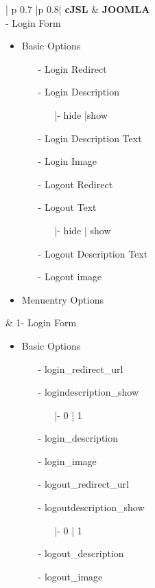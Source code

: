 \begin{minipage}{0.7\textwidth}
\begin{longtable}{| p {0.7\textwidth} |p {0.8\textwidth}|}
\hline
\textbf{cJSL}
&  
\textbf{JOOMLA} \\ - Login Form 
\begin{itemize}
\item Basic Options
	\begin{enumerate}
	\item[-]  Login Redirect
	\item[-]  Login Description
	\begin{enumerate}
	\item[|-]hide |show 
	\end{enumerate}
	\item[-]  Login Description Text 
	\item[-]  Login Image 
	\item[-]  Logout Redirect 
	\item[-]  Logout Text
	\begin{enumerate}
		\item[|-]hide | show
	\end{enumerate} 
	\item[-]  Logout Description Text 
	\item[-]  Logout image 
	\end{enumerate}
\item Menuentry Options
\end{itemize} 
&
1- Login Form 
\begin{itemize}
\item Basic Options
	\begin{enumerate}
	\item[-]  login\_redirect\_url
	\item[-]  logindescription\_show
	\begin{enumerate}
	\item[|-]0 | 1
	\end{enumerate}
	\item[-]  login\_description 
	\item[-]  login\_image 
	\item[-]  logout\_redirect\_url 
	\item[-]  logoutdescription\_show
	\begin{enumerate}
		\item[|-]0 | 1
	\end{enumerate} 
	\item[-]  logout\_description 
	\item[-]  logout\_image 

\end{enumerate}
\end{itemize}
\end{longtable}
\end{minipage}

